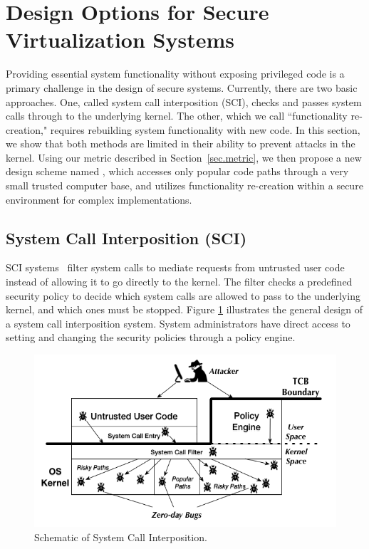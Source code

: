 \section{Design Options for Secure Virtualization Systems}
\label{sec.design}

Providing essential system functionality without exposing privileged code is a
primary challenge in the design of secure systems.
Currently, there are two basic approaches.
One, called system call interposition (SCI), checks and passes system calls
through to the underlying kernel. The other, which we call ``functionality
re-creation," requires rebuilding system functionality with new code. In this
section, we show that both methods are limited in their ability to
prevent attacks in the kernel.
Using our metric described in Section~\ref{sec.metric},
we then propose a new design scheme named \lip, which accesses only popular 
code paths through a very small trusted computer base, and utilizes 
functionality re-creation within a secure environment for complex implementations.

\subsection{System Call Interposition (SCI)}
SCI systems~\cite{Janus0:96, Janus:99} filter system calls to mediate requests
from untrusted user code instead of allowing it to go directly to the kernel.
The filter checks a predefined security policy to decide which system calls are
allowed to pass to the underlying kernel, and which ones must be stopped.
Figure \ref{fig:design_system_call_interposition} illustrates the general design
of a system call interposition system. System administrators have direct access to
setting and changing the security policies through a policy engine.

\begin{figure}%
\centering
\includegraphics[width=1.0\columnwidth]{diagram/Virtualization_Design_Model_03.png}
\caption{\small Schematic of System Call Interposition.}
\label{fig:design_system_call_interposition}
\end{figure}


